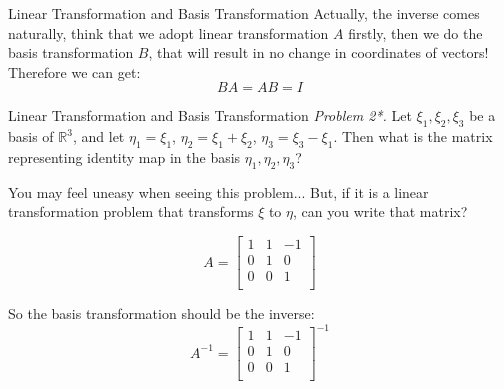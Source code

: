 \documentclass{beamer}
\begin{document}
\begin{frame}{Linear Transformation and Basis Transformation}
\vspace{3pt}
Actually, the inverse comes naturally, think that we adopt linear transformation $A$ firstly, then we do the basis transformation $B$, that will result in no change in coordinates of vectors! Therefore we can get:
\begin{equation*}
    BA=AB=I
\end{equation*}
\end{frame}

\begin{frame}{Linear Transformation and Basis Transformation}
\emph{Problem 2*.} Let $\xi _1, \xi _2, \xi _3$ be a basis of $\mathbb{R}^3$, and let $\eta _1=\xi _1$, $\eta _2=\xi _1+\xi _2$, $\eta _3=\xi _3-\xi _1$. Then what is the matrix representing identity map in the basis $\eta _1, \eta _2, \eta _3$?

\vspace{3pt}
You may feel uneasy when seeing this problem... But, if it is a linear transformation problem that transforms $\xi$ to $\eta$, can you write that matrix?

\begin{equation*}
    A=\left[ \begin{matrix}
        1&		1&		-1\\
        0&		1&		0\\
        0&		0&		1\\
    \end{matrix} \right]
\end{equation*}

So the basis transformation should be the inverse:
\begin{equation*}
    A^{-1}=\left[ \begin{matrix}
        1&		1&		-1\\
        0&		1&		0\\
        0&		0&		1\\
    \end{matrix} \right]^{-1}
\end{equation*}
\end{frame}
\end{document}
